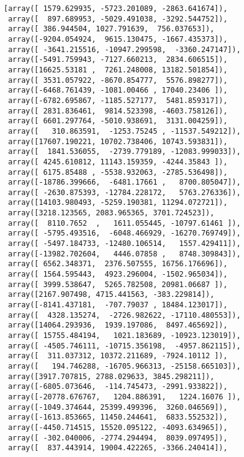 \documentclass[11pt]{article}
\makeatletter
\newcommand{\boxspacing}{\kern\kvtcb@left@rule\kern\kvtcb@boxsep}
\newcommand{\prompt}[4]{
        {\ttfamily\llap{{\color{#2}[#3]:\hspace{3pt}#4}}\vspace{-\baselineskip}}
    }
\makeatother
\begin{document}
            \begin{tcolorbox}[breakable, size=fbox, boxrule=.5pt, pad at break*=1mm, opacityfill=0]
\prompt{Out}{outcolor}{16}{\boxspacing}
\begin{Verbatim}[commandchars=\\\{\}]
[array([ 1579.629935, -5723.201089, -2863.641674]),
 array([  897.689953, -5029.491038, -3292.544752]),
 array([ 386.944504, 1027.791639,  756.037653]),
 array([-9204.054924,  9615.130475, -1667.435373]),
 array([ -3641.215516, -10947.299598,  -3360.247147]),
 array([-5491.759943, -7127.660213,  2834.606515]),
 array([16625.53181 ,  7261.248008, 13182.501854]),
 array([ 3531.057922, -8670.854777,  5576.898277]),
 array([-6468.761439, -1081.00466 , 17040.23406 ]),
 array([-6782.695867, -1185.527177,  5481.859317]),
 array([ 2831.836461,  9814.523398, -4603.758126]),
 array([ 6601.297764, -5010.938691,  3131.004259]),
 array([   310.863591,  -1253.75245 , -11537.549212]),
 array([17607.190221, 10702.738406, 10743.593831]),
 array([  1841.536055,  -2739.779189, -12083.999033]),
 array([ 4245.610812, 11143.159359, -4244.35843 ]),
 array([ 6175.85488 , -5538.932063, -2785.536498]),
 array([-18786.399666,  -6481.17661 ,   8700.805047]),
 array([ -2630.875393, -12784.228172,   5763.276336]),
 array([14103.980493, -5259.190381, 11294.072721]),
 array([3218.123565, 2083.965365, 3701.724523]),
 array([  8110.7652  ,   1611.055445, -10797.61461 ]),
 array([ -5795.493516,  -6048.466929, -16270.769749]),
 array([ -5497.184733, -12480.106514,   1557.429411]),
 array([-13982.702604,   4446.07858 ,   8748.309843]),
 array([ 6562.348371,  2376.507555, 16756.176696]),
 array([ 1564.595443,  4923.296004, -1502.965034]),
 array([ 3999.538647,  5265.782508, 20981.06687 ]),
 array([2167.907498, 4715.441563, -383.229814]),
 array([-8141.437181,  -707.79037 , 18484.123017]),
 array([  4328.135274,  -2726.982622, -17110.480553]),
 array([14064.293936,  1939.197086,  8497.465692]),
 array([ 15755.484194,   1021.183689, -10923.123019]),
 array([ -4505.746111, -10715.356198,  -4957.862115]),
 array([  311.037312, 10372.211689, -7924.10112 ]),
 array([   194.746288, -16705.966313, -25158.665103]),
 array([3917.707815, 2788.029633, 3845.298211]),
 array([-6805.073646,  -114.745473, -2991.933822]),
 array([-20778.676767,   1204.886391,   1224.16076 ]),
 array([-1049.374644, 25399.499396,  3260.046569]),
 array([-1613.853665, 11450.244641,  6833.552532]),
 array([-4450.714515, 15520.095122, -4093.634965]),
 array([ -302.040006, -2774.294494,  8039.097495]),
 array([  837.443914, 19004.422265, -3366.240414]),

\end{Verbatim}
\end{tcolorbox}
\end{document}
